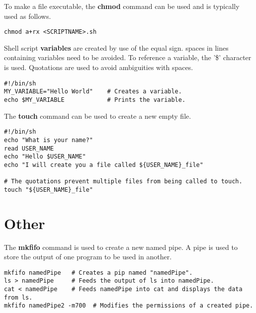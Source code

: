 To make a file executable, the \textbf{chmod} command can be used and is typically used as follows.
\begin{lstlisting}
chmod a+rx <SCRIPTNAME>.sh
\end{lstlisting}

Shell script \textbf{variables} are created by use of the equal sign. spaces in lines containing variables need to be avoided. To reference a variable, the '\$' character is used. Quotations are used to avoid ambiguities with spaces.
\begin{lstlisting}
#!/bin/sh
MY_VARIABLE="Hello World"    # Creates a variable.
echo $MY_VARIABLE            # Prints the variable.
\end{lstlisting}




The \textbf{touch} command can be used to create a new empty file.
\begin{lstlisting}
#!/bin/sh
echo "What is your name?"
read USER_NAME
echo "Hello $USER_NAME"
echo "I will create you a file called ${USER_NAME}_file"

# The quotations prevent multiple files from being called to touch.
touch "${USER_NAME}_file"
\end{lstlisting}



\section{Other}

The \textbf{mkfifo} command is used to create a new named pipe. A pipe is used to store the output of one program to be used in another.
\begin{lstlisting}
mkfifo namedPipe   # Creates a pip named "namedPipe".
ls > namedPipe     # Feeds the output of ls into namedPipe.
cat < namedPipe    # Feeds namedPipe into cat and displays the data from ls.
mkfifo namedPipe2 -m700  # Modifies the permissions of a created pipe.
\end{lstlisting}